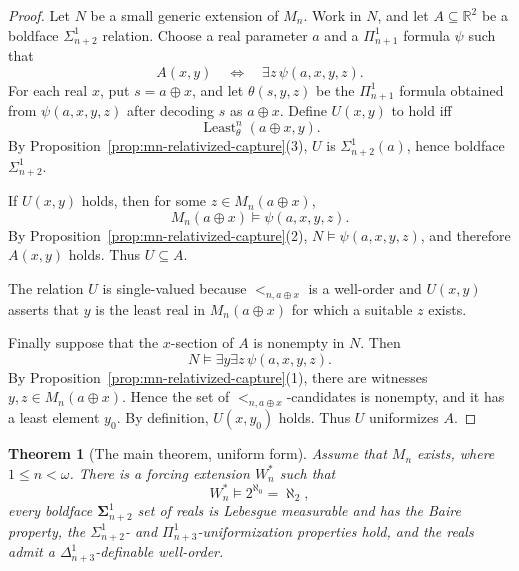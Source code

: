 \documentclass[a4paper,11pt]{article}
\newtheorem{theorem}{Theorem}[section]
\begin{document}
\begin{proof}
Let \(N\) be a small generic extension of \(M_n\).  Work in \(N\), and let
\(A\subseteq\mathbb R^2\) be a boldface \(\Sigma^1_{n+2}\) relation.  Choose a
real parameter \(a\) and a \(\Pi^1_{n+1}\) formula \(\psi\) such that
\[
   A(x,y)
   \quad\Longleftrightarrow\quad
   \exists z\,\psi(a,x,y,z).
\]
For each real \(x\), put \(s=a\oplus x\), and let \(\theta(s,y,z)\) be the
\(\Pi^1_{n+1}\) formula obtained from \(\psi(a,x,y,z)\) after decoding
\(s\) as \(a\oplus x\).  Define \(U(x,y)\) to hold iff
\[
   \operatorname{Least}^{n}_{\theta}(a\oplus x,y).
\]
By Proposition~\ref{prop:mn-relativized-capture}(3), \(U\) is
\(\Sigma^1_{n+2}(a)\), hence boldface \(\Sigma^1_{n+2}\).

If \(U(x,y)\) holds, then for some \(z\in M_n(a\oplus x)\),
\[
   M_n(a\oplus x)\models\psi(a,x,y,z).
\]
By Proposition~\ref{prop:mn-relativized-capture}(2),
\(N\models\psi(a,x,y,z)\), and therefore \(A(x,y)\) holds.  Thus
\(U\subseteq A\).

The relation \(U\) is single-valued because \(<_{n,a\oplus x}\) is a
well-order and \(U(x,y)\) asserts that \(y\) is the least real in
\(M_n(a\oplus x)\) for which a suitable \(z\) exists.

Finally suppose that the \(x\)-section of \(A\) is nonempty in \(N\).  Then
\[
   N\models\exists y\exists z\,\psi(a,x,y,z).
\]
By Proposition~\ref{prop:mn-relativized-capture}(1), there are witnesses
\(y,z\in M_n(a\oplus x)\).  Hence the set of \(<_{n,a\oplus x}\)-candidates is
nonempty, and it has a least element \(y_0\).  By definition, \(U(x,y_0)\)
holds.  Thus \(U\) uniformizes \(A\).
\end{proof}


\begin{theorem}[The main theorem, uniform form]\label{thm:main-mn-final}
Assume that $M_n$ exists, where $1\leq n<\omega$.  There is a forcing extension $W_n^\ast$ such that
\[
   W_n^\ast\models 2^{\aleph_0}=\aleph_2,
\]
every boldface $\boldsymbol\Sigma^1_{n+2}$ set of reals is Lebesgue measurable and has the Baire property, the $\Sigma^1_{n+2}$- and $\Pi^1_{n+3}$-uniformization properties hold, and the reals admit a $\Delta^1_{n+3}$-definable well-order.
\end{theorem}
\end{document}

